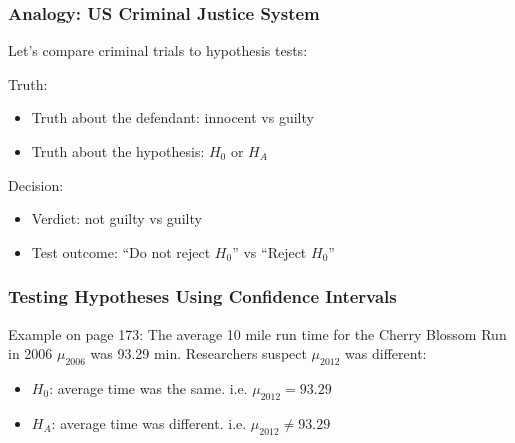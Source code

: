 \documentclass[handout]{beamer}
\newcommand{\blue}[1]{\textcolor{blue2}{#1}}
\newcommand{\xbar}{\overline{x}}
\begin{document}
\begin{frame}
\frametitle{Analogy:  US Criminal Justice System}

Let's compare criminal trials to hypothesis tests:

\vspace{0.5cm}

\pause \blue{Truth}:
\begin{itemize}
\item Truth about the defendant: innocent vs guilty
\item Truth about the hypothesis: $H_0$ or $H_A$
\end{itemize}

\vspace{0.25cm}

\pause \blue{Decision}:
\begin{itemize}
\item Verdict:  not guilty vs guilty
\item Test outcome: ``Do not reject $H_0$'' vs ``Reject $H_0$''
\end{itemize}

\end{frame}


\begin{frame}
\frametitle{Testing Hypotheses Using Confidence Intervals}
Example on page 173: The average 10 mile run time for the Cherry Blossom Run in 2006 $\mu_{2006}$ was 93.29 min.  Researchers suspect $\mu_{2012}$ was different:
\pause\begin{itemize}
\item $H_0$: average time was the same. i.e. $\mu_{2012} = 93.29$
\item $H_A$: average time was different. i.e. $\mu_{2012} \neq 93.29$
\end{itemize}

%
%
%
%
%
%
%

\end{frame}
\end{document}
